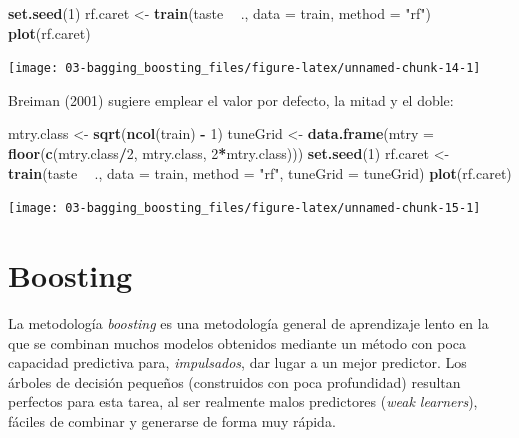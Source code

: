 \documentclass[]{book}
\newenvironment{Shaded}{\begin{snugshade}}{\end{snugshade}}
\newcommand{\KeywordTok}[1]{\textcolor[rgb]{0.13,0.29,0.53}{\textbf{#1}}}
\newcommand{\DataTypeTok}[1]{\textcolor[rgb]{0.13,0.29,0.53}{#1}}
\newcommand{\DecValTok}[1]{\textcolor[rgb]{0.00,0.00,0.81}{#1}}
\newcommand{\StringTok}[1]{\textcolor[rgb]{0.31,0.60,0.02}{#1}}
\newcommand{\OperatorTok}[1]{\textcolor[rgb]{0.81,0.36,0.00}{\textbf{#1}}}
\newcommand{\NormalTok}[1]{#1}
\theoremstyle{break}
\theoremstyle{definition}
\theoremstyle{definition}
\theoremstyle{definition}
\theoremstyle{remark}
\begin{document}
\begin{Shaded}
\begin{Highlighting}[]
\KeywordTok{set.seed}\NormalTok{(}\DecValTok{1}\NormalTok{)}
\NormalTok{rf.caret <-}\StringTok{ }\KeywordTok{train}\NormalTok{(taste }\OperatorTok{~}\StringTok{ }\NormalTok{., }\DataTypeTok{data =}\NormalTok{ train, }\DataTypeTok{method =} \StringTok{"rf"}\NormalTok{)}
\KeywordTok{plot}\NormalTok{(rf.caret)}
\end{Highlighting}
\end{Shaded}

\begin{center}\texttt{[image: 03-bagging\_boosting\_files/figure-latex/unnamed-chunk-14-1]} \end{center}

Breiman (2001) sugiere emplear el valor por defecto, la mitad y el
doble:

\begin{Shaded}
\begin{Highlighting}[]
\NormalTok{mtry.class <-}\StringTok{ }\KeywordTok{sqrt}\NormalTok{(}\KeywordTok{ncol}\NormalTok{(train) }\OperatorTok{-}\StringTok{ }\DecValTok{1}\NormalTok{)}
\NormalTok{tuneGrid <-}\StringTok{ }\KeywordTok{data.frame}\NormalTok{(}\DataTypeTok{mtry =} \KeywordTok{floor}\NormalTok{(}\KeywordTok{c}\NormalTok{(mtry.class}\OperatorTok{/}\DecValTok{2}\NormalTok{, mtry.class, }\DecValTok{2}\OperatorTok{*}\NormalTok{mtry.class)))}
\KeywordTok{set.seed}\NormalTok{(}\DecValTok{1}\NormalTok{)}
\NormalTok{rf.caret <-}\StringTok{ }\KeywordTok{train}\NormalTok{(taste }\OperatorTok{~}\StringTok{ }\NormalTok{., }\DataTypeTok{data =}\NormalTok{ train,}
                  \DataTypeTok{method =} \StringTok{"rf"}\NormalTok{, }\DataTypeTok{tuneGrid =}\NormalTok{ tuneGrid)}
\KeywordTok{plot}\NormalTok{(rf.caret)}
\end{Highlighting}
\end{Shaded}

\begin{center}\texttt{[image: 03-bagging\_boosting\_files/figure-latex/unnamed-chunk-15-1]} \end{center}

\section{Boosting}\label{boosting}

La metodología \emph{boosting} es una metodología general de aprendizaje
lento en la que se combinan muchos modelos obtenidos mediante un método
con poca capacidad predictiva para, \emph{impulsados}, dar lugar a un
mejor predictor. Los árboles de decisión pequeños (construidos con poca
profundidad) resultan perfectos para esta tarea, al ser realmente malos
predictores (\emph{weak learners}), fáciles de combinar y generarse de
forma muy rápida.
\end{document}
